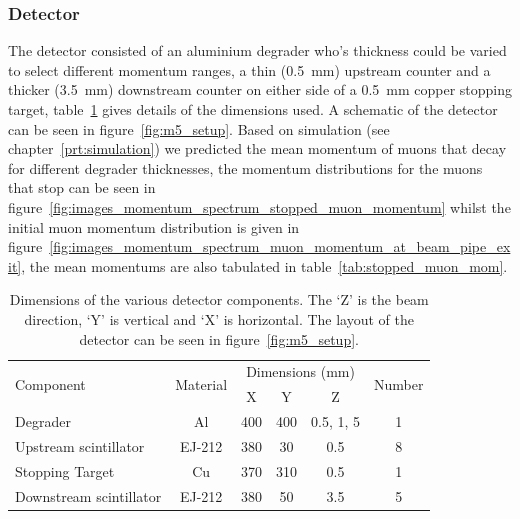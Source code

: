 \subsubsection{Detector} %
\label{sub:detector}
The detector consisted of an aluminium degrader who's thickness could be varied to select different momentum ranges, a thin (0.5~mm) upstream counter and a thicker (3.5~mm) downstream counter on either side of a 0.5~mm copper stopping target, table~\ref{tab:detector_dimensions} gives details of the dimensions used. A schematic of the detector can be seen in figure~\ref{fig:m5_setup}. Based on simulation (see chapter~\ref{prt:simulation}) we predicted the mean momentum of muons that decay for different degrader thicknesses, the momentum distributions for the muons that stop can be seen in figure~\ref{fig:images_momentum_spectrum_stopped_muon_momentum} whilst the initial muon momentum distribution is given in figure~\ref{fig:images_momentum_spectrum_muon_momentum_at_beam_pipe_exit}, the mean momentums are also tabulated in table~\ref{tab:stopped_muon_mom}.
\begin{table}
  \begin{center}
  \begin{tabular}{l | c | c | c | c | c}
    \multirow{2}{*}{Component}  &  \multirow{2}{*}{Material}  
                                            &  \multicolumn{3}{c|}{Dimensions (mm)}  &  \multirow{2}{*}{Number} \\
                                &           &      X      &      Y     &       Z     &                          \\
    \hline
    Degrader                    &    Al     &     400     &     400    &  0.5, 1, 5  &  1                       \\
    Upstream scintillator       &  EJ-212   &     380     &     30     &      0.5    &  8                       \\    
    Stopping Target             &    Cu     &     370     &     310    &      0.5    &  1                       \\    
    Downstream scintillator     &  EJ-212   &     380     &     50     &      3.5    &  5                       \\    
  \end{tabular}
  \end{center}
  \caption{Dimensions of the various detector components. The `Z' is the beam direction, `Y' is vertical and `X' is horizontal. The layout of the detector can be seen in figure~\ref{fig:m5_setup}.}
  \label{tab:detector_dimensions}
\end{table}

